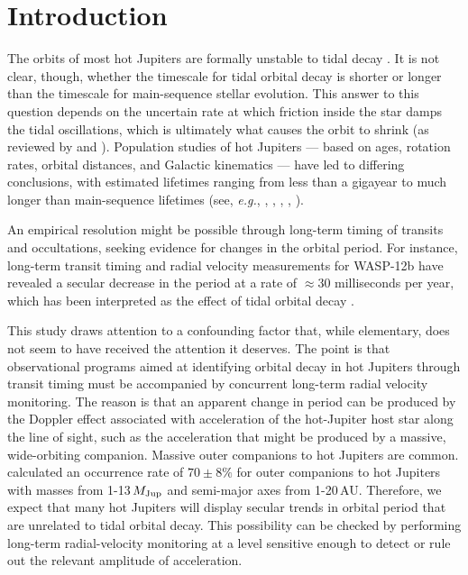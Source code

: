 \documentclass[12pt,twocolumn,tighten]{aastex62}
\begin{document}


\section{Introduction}

The orbits of most hot Jupiters are formally unstable to tidal decay
\citep{counselman_outcomes_1973,hut_stability_1980,rasio_tidal_1996,levrard_falling_2009,matsumura_tidal_2010}.
It is not clear, though, whether the timescale for tidal orbital decay
is shorter or longer than the timescale for main-sequence stellar
evolution.  This answer to this question depends on the uncertain rate
at which friction inside the star damps the tidal oscillations, which
is ultimately what causes the orbit to shrink (as reviewed by
\citealt{Mazeh2008} and \citealt{ogilvie_tidal_2014}).  Population
studies of hot Jupiters --- based on ages, rotation rates, orbital
distances, and Galactic kinematics --- have led to differing
conclusions, with estimated lifetimes ranging from less than a
gigayear to much longer than main-sequence lifetimes (see, {\it e.g.},
\citealt{jackson_observational_2009}, \citealt{teitler_why_2014},
\citealt{penev_empirical_2018}, \citealt{cameron_hierarchical_2018},
\citealt{hamer_schlaufman_2019}).

An empirical resolution might be possible through long-term timing of
transits and occultations, seeking evidence for changes in the orbital
period.  For instance, long-term transit timing and radial velocity
measurements for WASP-12b have revealed a secular decrease in the
period at a rate of $\approx$30 milliseconds per year, which has been
interpreted as the effect of tidal orbital decay
\citep{maciejewski_departure_2016,patra_2017,maciejewski_planet-star_2018,yee_orbit_2020}.

This study draws attention to a confounding factor that, while
elementary, does not seem to have received the attention it deserves.
The point is that observational programs aimed at identifying orbital
decay in hot Jupiters through transit timing must be accompanied by
concurrent long-term radial velocity monitoring.  The reason is that
an apparent change in period can be produced by the Doppler effect
associated with acceleration of the hot-Jupiter host star along the
line of sight, such as the acceleration that might be produced by a
massive, wide-orbiting companion.  Massive outer companions to hot
Jupiters are common.  \citet{bryan_statistics_2016} calculated an
occurrence rate of $70\pm8\%$ for outer companions to hot Jupiters
with masses from 1-13$\,$$M_{\rm Jup}$ and semi-major axes from
1-20$\,$AU.  Therefore, we expect that many hot Jupiters will display
secular trends in orbital period that are unrelated to tidal orbital
decay.  This possibility can be checked by performing long-term
radial-velocity monitoring at a level sensitive enough to detect or
rule out the relevant amplitude of acceleration.
\end{document}

